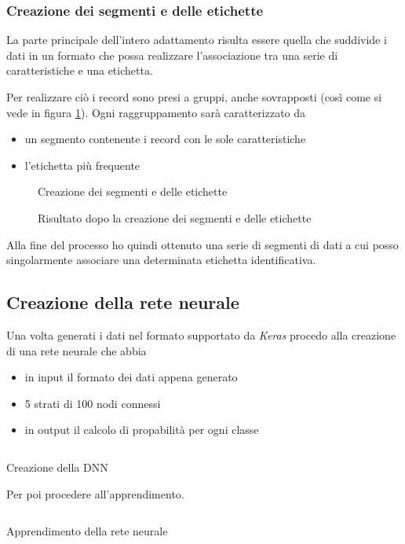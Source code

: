 \subsubsection{Creazione dei segmenti e delle etichette}
La parte principale dell'intero adattamento risulta essere quella che suddivide i dati in un formato che possa 
realizzare l'associazione tra una serie di caratteristiche e una etichetta.

Per realizzare ciò i record sono presi a gruppi, anche sovrapposti (così come si vede in figura \ref{fig:create_segments_and_labels}). 
Ogni raggruppamento sarà caratterizzato da 
\begin{itemize}
    \item un segmento contenente i record con le sole caratteristiche
    \item l'etichetta più frequente
\end{itemize}

\begin{figure}[H]
  \centering
  
  \caption{Creazione dei segmenti e delle etichette}
  \label{fig:create_segments_and_labels}
\end{figure}

\begin{figure}[H]
  \centering
  
  \caption{Risultato dopo la creazione dei segmenti e delle etichette}
  \label{fig:segments_and_labels}
\end{figure}

Alla fine del processo ho quindi ottenuto una serie di segmenti di dati a cui posso singolarmente associare una determinata
etichetta identificativa.

\newpage
\subsection{Creazione della rete neurale}
Una volta generati i dati nel formato supportato da \textit{Keras} procedo alla creazione di 
una rete neurale che abbia
\begin{itemize}
    \item in input il formato dei dati appena generato
    \item 5 strati di 100 nodi connessi
    \item in output il calcolo di propabilità per ogni classe
\end{itemize}
\begin{listing}[H] 
    \inputminted[frame=single,framesep=10pt]{python}{snippets/dnn_create.py}
    \caption{Creazione della DNN}
\end{listing}
Per poi procedere all'apprendimento.
\begin{listing}[H] 
    \inputminted[frame=single,framesep=10pt]{python}{snippets/dnn_fit.py}
    \caption{Apprendimento della rete neurale}
\end{listing}

